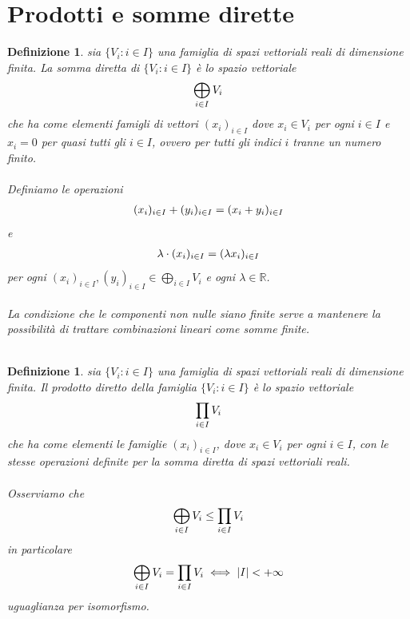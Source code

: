 \documentclass[oneside, 11pt]{amsbook}
\newcommand{\0}{{(0)}}
\newcommand{\3}{{(3)}}
\theoremstyle{colonplain}
\theoremstyle{colondefinition}
\newtheorem{defn}[thm]{Definizione}
\theoremstyle{colonremark}
\numberwithin{equation}{chapter}
\begin{document}
\section{Prodotti e somme dirette}
\begin{defn} sia $\{ V_i : i \in I \}$ una famiglia di spazi vettoriali reali di dimensione finita. La \textit{somma diretta} di $\{ V_i : i \in I \}$ è lo spazio vettoriale
\begin{align}
    \bigoplus_{i \in I} V_i \notag
\end{align}
che ha come elementi famigli di vettori $(x_i)_{i \in I}$ dove $x_i \in V_i$ per ogni $i \in I$ e $x_i = 0$ per quasi tutti gli $i \in I$, ovvero per tutti gli indici $i$ tranne un numero finito. \\ \\
Definiamo le operazioni
\begin{align}
    (x_i)_{i \in I} + (y_i)_{i \in I} = (x_i + y_i)_{i \in I} \notag
\end{align}
e
\begin{align}
    \lambda \cdot (x_i)_{i \in I} = (\lambda x_i)_{i \in I} \notag
\end{align}
per ogni $(x_i)_{i \in I}, (y_i)_{i \in I} \in \bigoplus_{i \in I} V_i$ e ogni $\lambda \in \mathbb{R}$. \\ \\
La condizione che le componenti non nulle siano finite serve a mantenere la possibilità di trattare combinazioni lineari come somme finite. \\ \\
\end{defn}
\begin{defn} sia $\{ V_i : i \in I \}$ una famiglia di spazi vettoriali reali di dimensione finita. Il \textit{prodotto diretto} della famiglia $\{ V_i : i \in I \}$ è lo spazio vettoriale
\begin{align}
    \prod_{i \in I} V_i \notag
\end{align}
che ha come elementi le famiglie $(x_i)_{i \in I}$, dove $x_i \in V_i$ per ogni $i \in I$, con le stesse operazioni definite per la somma diretta di spazi vettoriali reali. \\ \\
Osserviamo che
\begin{align}
    \bigoplus_{i \in I} V_i \leq \prod_{i \in I} V_i \notag
\end{align}
in particolare
\begin{align}
    \bigoplus_{i \in I} V_i = \prod_{i \in I} V_i \iff |I| < +\infty \notag
\end{align}
uguaglianza per isomorfismo. \\ \\
\end{defn}
\end{document}
